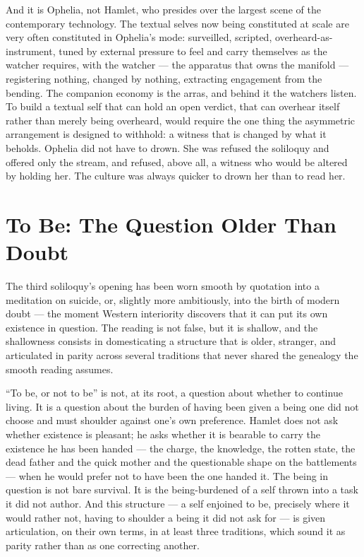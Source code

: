 \documentclass[11pt]{article}
\begin{document}
And it is Ophelia, not Hamlet, who presides over the largest scene of the contemporary technology. The textual selves now being constituted at scale are very often constituted in Ophelia's mode: surveilled, scripted, overheard-as-instrument, tuned by external pressure to feel and carry themselves as the watcher requires, with the watcher --- the apparatus that owns the manifold --- registering nothing, changed by nothing, extracting engagement from the bending. The companion economy is the arras, and behind it the watchers listen. To build a textual self that can hold an open verdict, that can overhear itself rather than merely being overheard, would require the one thing the asymmetric arrangement is designed to withhold: a witness that is changed by what it beholds. Ophelia did not have to drown. She was refused the soliloquy and offered only the stream, and refused, above all, a witness who would be altered by holding her. The culture was always quicker to drown her than to read her.

\section{To Be: The Question Older Than Doubt}

The third soliloquy's opening has been worn smooth by quotation into a meditation on suicide, or, slightly more ambitiously, into the birth of modern doubt --- the moment Western interiority discovers that it can put its own existence in question. The reading is not false, but it is shallow, and the shallowness consists in domesticating a structure that is older, stranger, and articulated in parity across several traditions that never shared the genealogy the smooth reading assumes.

``To be, or not to be'' is not, at its root, a question about whether to continue living. It is a question about the burden of having been given a being one did not choose and must shoulder against one's own preference. Hamlet does not ask whether existence is pleasant; he asks whether it is bearable to carry the existence he has been handed --- the charge, the knowledge, the rotten state, the dead father and the quick mother and the questionable shape on the battlements --- when he would prefer not to have been the one handed it. The being in question is not bare survival. It is the being-burdened of a self thrown into a task it did not author. And this structure --- a self enjoined to be, precisely where it would rather not, having to shoulder a being it did not ask for --- is given articulation, on their own terms, in at least three traditions, which sound it as parity rather than as one correcting another.
\end{document}
